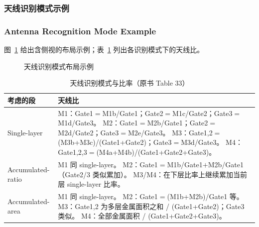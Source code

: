 \subsubsection{天线识别模式示例}
\subsubsection*{Antenna Recognition Mode Example}

图~\ref{fig:antenna-recog-layout} 给出含侧视的布局示例；表~\ref{tab:antenna-recog-ratios} 列出各识别模式下的天线比。

\begin{figure}[htbp]
\centering
{}
\caption{天线识别模式布局示例}
\label{fig:antenna-recog-layout}
\end{figure}

\begin{table}[htbp]
\centering
\caption{天线识别模式与比率（原书 Table 33）}
\label{tab:antenna-recog-ratios}
\small
\begin{tabularx}{\textwidth}{@{}l >{\raggedright\arraybackslash}X@{}}
\toprule
考虑的段 & 天线比 \\
\midrule
Single-layer &
M1：Gate1$=$M1b/Gate1；Gate2$=$M1c/Gate2；Gate3$=$M1d/Gate3。\newline
M2：Gate1$=$M2b/Gate1；Gate2$=$M2d/Gate2；Gate3$=$M2e/Gate3。\newline
M3：Gate1,2$=$(M3b+M3c)/(Gate1+Gate2)；Gate3$=$M3d/Gate3。\newline
M4：Gate1,2,3$=$(M4a+M4b)/(Gate1+Gate2+Gate3)。 \\
\midrule
Accumulated-ratio &
M1 同 single-layer。\newline
M2：Gate1$=$M1b/Gate1$+$M2b/Gate1（Gate2/3 类似累加）。\newline
M3/M4：在下层比率上继续累加当前层 single-layer 比率。 \\
\midrule
Accumulated-area &
M1 同 single-layer。\newline
M2：Gate1$=$(M1b+M2b)/Gate1 等。\newline
M3：Gate1,2 为多层金属面积之和 / (Gate1+Gate2)；Gate3 类似。\newline
M4：全部金属面积 / (Gate1+Gate2+Gate3)。 \\
\bottomrule
\end{tabularx}
\end{table}

